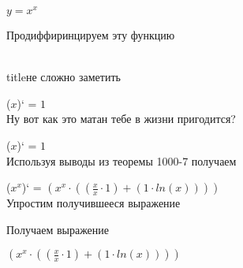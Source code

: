 \documentclass[12pt,a4paper,fleqn]{article}
\begin{document}
$y = $$x^{x}$

 Продиффиринцируем эту функцию

\\ title{не сложно заметить} 

($x$)` = $1$\\
Ну вот как это матан тебе в жизни пригодится?

($x$)` = $1$\\
Используя выводы из теоремы 1000-7 получаем

($x^{x}$)` = $(x^{x} \cdot ((\frac{x}{x} \cdot 1) + (1 \cdot ln(x))))$\\


Упростим получившееся выражение



 Получаем выражение

$(x^{x} \cdot ((\frac{x}{x} \cdot 1) + (1 \cdot ln(x))))$
\end{document}
